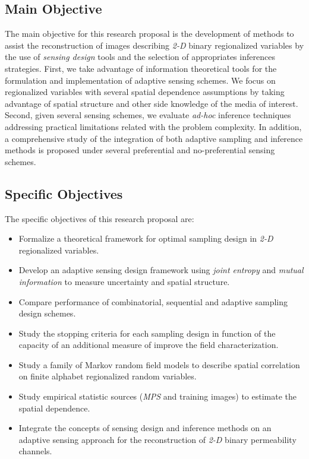 \subsection{Main Objective}
\label{sec_Main_Obj}

The main objective for this research proposal is the development of methods to assist the reconstruction of images describing \emph{2-D} binary regionalized variables by the use of \emph{sensing design} tools and the selection of appropriates inferences strategies. First, we take advantage of information theoretical tools for the formulation and implementation of adaptive sensing schemes. We focus on regionalized variables with several spatial dependence assumptions by taking advantage of spatial structure and other side knowledge of the media of interest. Second, given several sensing schemes, we evaluate \emph{ad-hoc} inference techniques addressing practical limitations related with the problem complexity. In addition, a comprehensive study of the integration of both adaptive sampling and inference methods is proposed under several preferential and no-preferential sensing schemes. 

\subsection{Specific Objectives}
\label{sec_Spec_Obj}

The specific objectives of this research proposal are:

\begin{itemize}
	\item Formalize a theoretical framework for optimal sampling design in \emph{2-D} regionalized variables. 
	\item Develop an adaptive sensing design framework using \emph{joint entropy} and \emph{mutual information} to measure uncertainty and spatial structure. 
	\item Compare performance of combinatorial, sequential and adaptive sampling design schemes.
	\item Study the stopping criteria for each sampling design in function of the capacity of an additional measure of improve the field characterization.
	\item Study a family of Markov random field models to describe spatial correlation on finite alphabet regionalized random variables.
	\item Study empirical statistic sources (\emph{MPS} and training images) to estimate the spatial dependence.
	\item Integrate the concepts of sensing design and inference methods on an adaptive sensing approach for the reconstruction of \emph{2-D} binary permeability channels.
\end{itemize}






